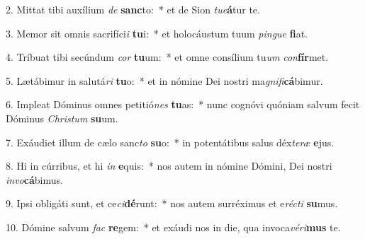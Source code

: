 2. Mittat tibi auxílium \textit{de} \textbf{sanc}to:~*  et de Sion \textit{tu}\textit{e}\textbf{á}tur te.\

3. Memor sit omnis sacrifíci\textit{i} \textbf{tu}i:~*  et holocáustum tuum \textit{pin}\textit{gue} \textbf{fi}at.\

4. Tríbuat tibi secúndum \textit{cor} \textbf{tu}um:~*  et omne consílium tu\textit{um} \textit{con}\textbf{fír}met.\

5. Lætábimur in salutá\textit{ri} \textbf{tu}o:~*  et in nómine Dei nostri ma\textit{gni}\textit{fi}\textbf{cá}bimur.\

6. Impleat Dóminus omnes petitió\textit{nes} \textbf{tu}as:~*  nunc cognóvi quóniam salvum fecit Dóminus \textit{Chris}\textit{tum} \textbf{su}um.\

7. Exáudiet illum de cælo sanc\textit{to} \textbf{su}o:~*  in potentátibus salus déx\textit{te}\textit{ræ} \textbf{e}jus.\

8. Hi in cúrribus, et hi \textit{in} \textbf{e}quis:~*  nos autem in nómine Dómini, Dei nostri \textit{in}\textit{vo}\textbf{cá}bimus.\

9. Ipsi obligáti sunt, et ce\textit{ci}\textbf{dé}runt:~*  nos autem surréximus et e\textit{réc}\textit{ti} \textbf{su}mus.\

10. Dómine salvum \textit{fac} \textbf{re}gem:~*  et exáudi nos in die, qua invoca\textit{vé}\textit{ri}\textbf{mus} te.\


